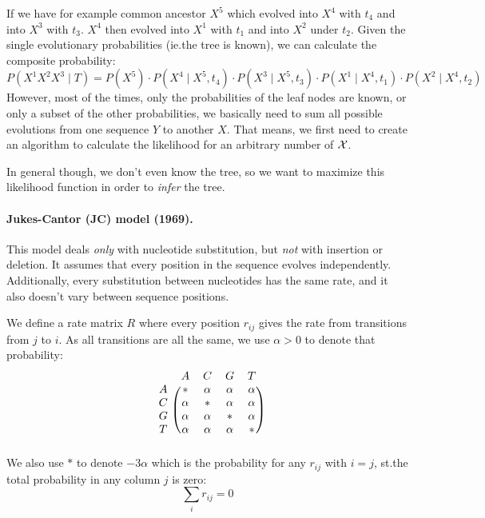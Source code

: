 If we have for example common ancestor \(X^5\) which evolved into
\(X^4\) with \(t_4\) and into \(X^3\) with \(t_3\).  \(X^4\) then evolved into
\(X^1\) with \(t_1\) and into \(X^2\) under \(t_2\).  Given the single
evolutionary probabilities (ie.\@ the tree is known), we can calculate the
composite probability:
\[
  P(X^1 X^2 X^3 \mid T) = P(X^5) \cdot
                          P(X^4 \mid X^5, t_4) \cdot
                          P(X^3 \mid X^5, t_3) \cdot
                          P(X^1 \mid X^4, t_1) \cdot
                          P(X^2 \mid X^4, t_2)
\]
However, most of the times, only the probabilities of the leaf nodes are known,
or only a subset of the other probabilities, we basically need to sum all
possible evolutions from one sequence \(Y\) to another \(X\).
That means, we first need to create an algorithm to calculate the likelihood
for an arbitrary number of \(\mathcal{X}\).

In general though, we don't even know the tree, so we want to maximize this
likelihood function in order to \emph{infer} the tree.

\paragraph{Jukes-Cantor (JC) model (1969).}
This model deals \emph{only} with
nucleotide substitution, but \emph{not} with insertion or deletion.
It assumes that every position in the sequence evolves independently.
Additionally, every substitution between nucleotides has the same rate, and
it also doesn't vary between sequence positions.

We define a rate matrix \(R\) where every position \(r_{ij}\) gives the
rate from transitions from \(j\) to \(i\).  As all transitions are all
the same, we use \(\alpha>0\) to denote that probability:
\[
\begin{blockarray}{ccccc}
  & A      & C      & G      & T \\
\begin{block}{c(cccc)}
A & *      & \alpha & \alpha & \alpha \\
C & \alpha & *      & \alpha & \alpha \\
G & \alpha & \alpha & *      & \alpha \\
T & \alpha & \alpha & \alpha & *      \\
\end{block}
\end{blockarray}
\]
We also use \(*\) to denote \(-3\alpha\) which is the probability for any
\(r_{ij}\) with \(i=j\), st.\@ the total probability in any column \(j\) is
zero:
\[
  \sum_i r_{ij} = 0
\]

